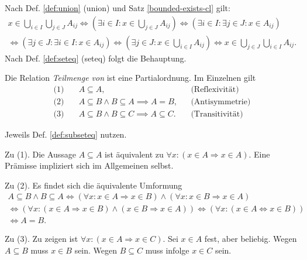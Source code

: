 \begin{Beweis}
Nach Def. \ref{def:union} (union) und Satz \ref{bounded-exists-cl} gilt:
\begin{gather*}
x\in\bigcup_{i\in I}\bigcup_{j\in J} A_{ij}
\iff (\exists i{\in}I\colon x\in\bigcup_{j\in J} A_{ij})
\iff (\exists i{\in}I\colon\exists j{\in}J\colon x\in A_{ij})\\
\iff (\exists j{\in}J\colon\exists i{\in}I\colon x\in A_{ij})
\iff (\exists j{\in}J\colon x\in \bigcup_{i\in I}A_{ij})
\iff x\in\bigcup_{j\in J}\bigcup_{i\in I} A_{ij}.
\end{gather*}
Nach Def. \ref{def:seteq} (seteq) folgt die Behauptung.\,\qedsymbol
\end{Beweis}

\begin{Satz}
Die Relation \emph{Teilmenge von} ist eine Partialordnung.
Im Einzelnen gilt%
\begin{align*}
\text{(1)}\quad & A\subseteq A, && \text{(Reflexivität)}\\
\text{(2)}\quad & A\subseteq B\land B\subseteq A \implies A = B, && \text{(Antisymmetrie)}\\
\text{(3)}\quad & A\subseteq B\land B\subseteq C \implies A\subseteq C. && \text{(Transitivität)}
\end{align*}
\end{Satz}
\begin{Beweis}
Jeweils Def. \ref{def:subseteq} nutzen.

Zu (1). Die Aussage $A\subseteq A$ ist 
äquivalent zu $\forall x\colon (x\in A\Rightarrow x\in A)$.
Eine Prämisse impliziert sich im Allgemeinen selbst.

Zu (2). Es findet sich die äquivalente Umformung
\begin{gather*}
A\subseteq B\land B\subseteq A\iff
(\forall x\colon x\in A\Rightarrow x\in B)
\land (\forall x\colon x\in B\Rightarrow x\in A)\\
\iff (\forall x\colon (x\in A\Rightarrow x\in B)\land (x\in B\Rightarrow x\in A))
\iff (\forall x\colon (x\in A\Leftrightarrow x\in B))\\
\iff A = B.
\end{gather*}

Zu (3). Zu zeigen ist $\forall x\colon (x\in A\Rightarrow x\in C)$.
Sei $x\in A$ fest, aber beliebig. Wegen $A\subseteq B$ muss $x\in B$
sein. Wegen $B\subseteq C$ muss infolge $x\in C$ sein.\,\qedsymbol
\end{Beweis}


